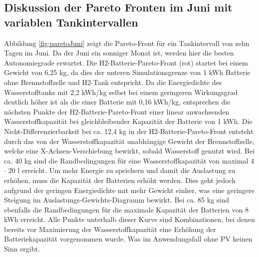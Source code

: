 \subsection{Diskussion der Pareto Fronten im Juni mit variablen Tankintervallen}
Abbildung \ref{fig:paretoJuni} zeigt die Pareto-Front für ein Tankintervall von zehn Tagen im Juni. Da der Juni ein sonniger Monat ist, werden hier die besten Autonomiegrade erwartet. Die H2-Batterie-Pareto-Front (rot) startet bei einem Gewicht von 6,25 kg, da dies der unteren Simulationsgrenze von 1 kWh Batterie ohne Brennstoffzelle und H2-Tank entspricht. Da die Energiedichte des Wasserstofftanks mit 2,2 kWh/kg selbst bei einem geringeren Wirkungsgrad deutlich höher ist als die einer Batterie mit 0,16 kWh/kg, entsprechen die nächsten Punkte der H2-Batterie-Pareto-Front einer linear anwachsenden Wasserstoffkapazität bei gleichbleibender Kapazität der Batterie von 1 kWh. Die Nicht-Differenzierbarkeit bei ca. 12,4 kg in der H2-Batterie-Pareto-Front entsteht durch das von der Wasserstoffkapazität unabhängige Gewicht der Brennstoffzelle, welche eine X-Achsen-Verschiebung bewirkt, sobald Wasserstoff genutzt wird. Bei ca. 40 kg sind die Randbedingungen für eine Wasserstoffkapazität von maximal 4 $\cdot$ 20 l erreicht. Um mehr Energie zu speichern und damit die Auslastung zu erhöhen, muss die Kapazität der Batterien erhöht werden. Dies geht jedoch aufgrund der geringen Energiedichte mit mehr Gewicht einher, was eine geringere Steigung im Auslastungs-Gewichts-Diagramm bewirkt. Bei ca. 85 kg sind ebenfalls die Randbedingungen für die maximale Kapazität der Batterien von 8 kWh erreicht. Alle Punkte unterhalb dieser Kurve sind Kombinationen, bei denen bereits vor Maximierung der Wasserstoffkapazität eine Erhöhung der Batteriekapazität vorgenommen wurde. Was im Anwendungsfall ohne PV keinen Sinn ergibt. \\


